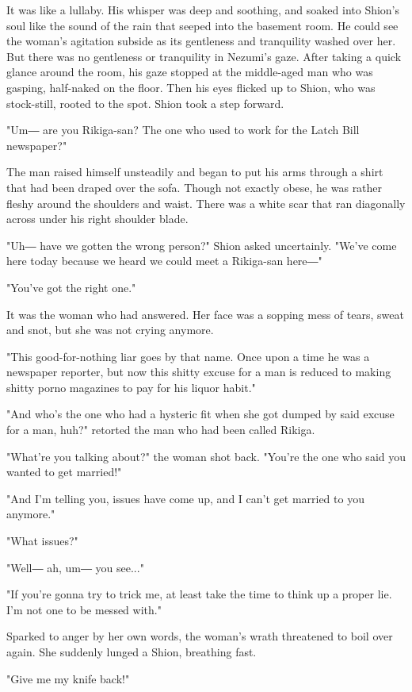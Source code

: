 It was like a lullaby. His whisper was deep and soothing, and soaked
into Shion's soul like the sound of the rain that seeped into the
basement room. He could see the woman's agitation subside as its
gentleness and tranquility washed over her. But there was no gentleness
or tranquility in Nezumi's gaze. After taking a quick glance around the
room, his gaze stopped at the middle-aged man who was gasping,
half-naked on the floor. Then his eyes flicked up to Shion, who was
stock-still, rooted to the spot. Shion took a step forward.

"Um― are you Rikiga-san? The one who used to work for the Latch Bill
newspaper?"

The man raised himself unsteadily and began to put his arms through a
shirt that had been draped over the sofa. Though not exactly obese, he
was rather fleshy around the shoulders and waist. There was a white scar
that ran diagonally across under his right shoulder blade.

"Uh― have we gotten the wrong person?" Shion asked uncertainly. "We've
come here today because we heard we could meet a Rikiga-san here―"

"You've got the right one."

It was the woman who had answered. Her face was a sopping mess of tears,
sweat and snot, but she was not crying anymore.

"This good-for-nothing liar goes by that name. Once upon a time he was a
newspaper reporter, but now this shitty excuse for a man is reduced to
making shitty porno magazines to pay for his liquor habit."

"And who's the one who had a hysteric fit when she got dumped by said
excuse for a man, huh?" retorted the man who had been called Rikiga.

"What're you talking about?" the woman shot back. "You're the one who
said you wanted to get married!"

"And I'm telling you, issues have come up, and I can't get married to
you anymore."

"What issues?"

"Well― ah, um― you see..."

"If you're gonna try to trick me, at least take the time to think up a
proper lie. I'm not one to be messed with."

Sparked to anger by her own words, the woman's wrath threatened to boil
over again. She suddenly lunged a Shion, breathing fast.

"Give me my knife back!"

